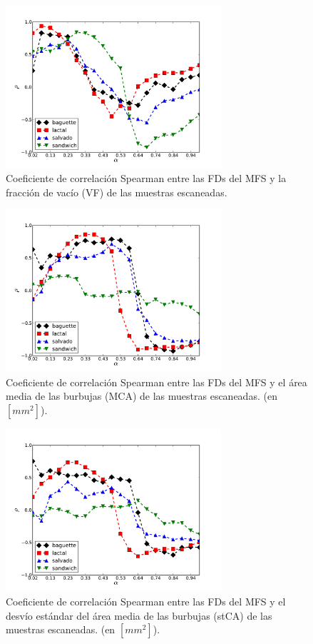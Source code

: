 \begin{figure}[h!]
\centering
\includegraphics[width=8cm]{figures/VF}
\caption{Coeficiente de correlación Spearman entre las FDs del MFS y la fracción de vacío (VF) de las muestras escaneadas.}
\label{fig:corrVF}
\end{figure}

\begin{figure}[h!]
\centering
\includegraphics[width=8cm]{figures/MCA}
\caption{Coeficiente de correlación Spearman entre las FDs del MFS y el área media de las burbujas (MCA) de las muestras escaneadas. (en $[mm^{2}]$).}
\label{fig:corrMCA}
\end{figure}

\begin{figure}[h!]
\centering
\includegraphics[width=8cm]{figures/stMCA}
\caption{Coeficiente de correlación Spearman entre las FDs del MFS y el desvío estándar del área media de las burbujas (stCA) de las muestras escaneadas. (en $[mm^{2}]$).}
\label{fig:corrMCAstdev}
\end{figure}

